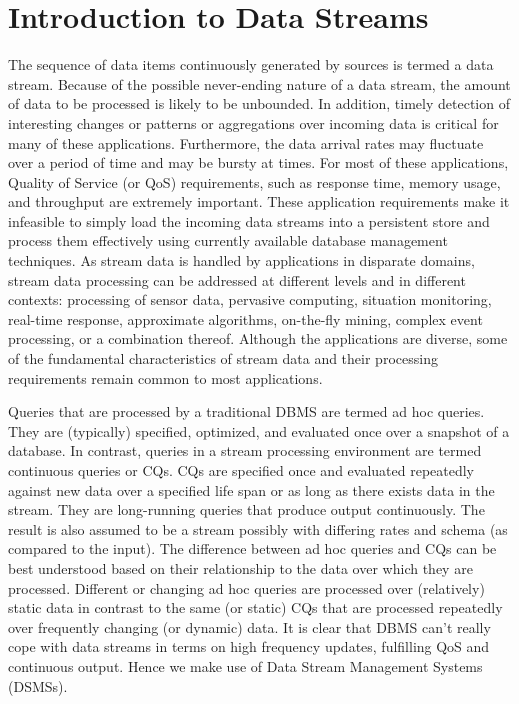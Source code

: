 \section{Introduction to Data Streams}
The sequence of data items continuously generated by sources is termed a data stream. Because of the possible never-ending nature of a data stream, the amount of data to be processed is likely to be unbounded. In addition, timely detection of interesting changes or patterns or aggregations over incoming data is critical for many of these applications. Furthermore, the data arrival rates may fluctuate over a period of time and may be bursty at times. For most of these applications, Quality of Service (or QoS) requirements, such as response time, memory usage, and throughput are extremely important. These application requirements make it infeasible to simply load the incoming data streams into a persistent store and process them effectively using currently available database management techniques. As stream data is handled by applications in disparate domains, stream data processing can be addressed at different levels and in different contexts: processing of sensor data, pervasive computing, situation monitoring, real-time response, approximate algorithms, on-the-fly mining, complex event processing, or a combination thereof. Although the applications are diverse, some of the fundamental characteristics of stream data and their processing requirements remain common to most applications.
\par Queries that are processed by a traditional DBMS are termed ad hoc queries. They are (typically) specified, optimized, and evaluated once over a snapshot of a database. In contrast, queries in a stream processing environment are termed continuous queries or CQs. CQs are specified once and evaluated repeatedly against new data over a specified life span or as long as there exists data in the stream. They are long-running queries that produce output continuously. The result is also assumed to be a stream possibly with differing rates and schema (as compared to the input). The difference between ad hoc queries and CQs can be best understood based on their relationship to the data over which they are processed. Different or changing ad hoc queries are processed over (relatively) static data in contrast to the same (or static) CQs that are processed repeatedly over frequently changing (or dynamic) data. It is clear that DBMS can't really cope with data streams in terms on high frequency updates, fulfilling QoS and continuous output. Hence we make use of Data Stream Management Systems (DSMSs).


